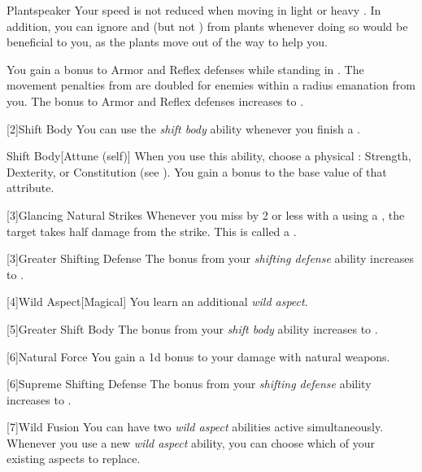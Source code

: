 {            \begin{freeability}{Plantspeaker}
                Your speed is not reduced when moving in light or heavy .
                In addition, you can ignore  and  (but not ) from plants whenever doing so would be beneficial to you, as the plants move out of the way to help you.

                \rankline
                 You gain a  bonus to Armor and Reflex defenses while standing in .
                 The movement penalties from  are doubled for enemies within a \areahuge radius emanation from you.
                 The bonus to Armor and Reflex defenses increases to .
            \end{freeability}
        }

        [2]{Shift Body} You can use the \textit{shift body} ability whenever you finish a .
        \begin{freeability}{Shift Body}[Attune (self)]
            When you use this ability, choose a physical : Strength, Dexterity, or Constitution (see ).
            You gain a  bonus to the base value of that attribute.
        \end{freeability}

        [3]{Glancing Natural Strikes} Whenever you miss by 2 or less with a  using a , the target takes half damage from the strike.
        This is called a .

        [3]{Greater Shifting Defense}
        The bonus from your \textit{shifting defense} ability increases to .

        [4]{Wild Aspect}[Magical]
        You learn an additional \textit{wild aspect}.

        [5]{Greater Shift Body} The bonus from your \textit{shift body} ability increases to .

        [6]{Natural Force} You gain a \plus1d bonus to your damage with natural weapons.

        [6]{Supreme Shifting Defense}
        The bonus from your \textit{shifting defense} ability increases to .

        [7]{Wild Fusion} You can have two \textit{wild aspect} abilities active simultaneously.
        Whenever you use a new \textit{wild aspect} ability, you can choose which of your existing aspects to replace.

